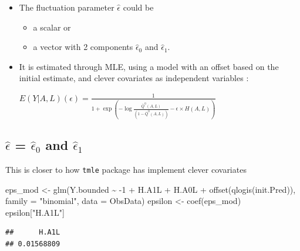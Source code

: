 \documentclass[
]{book}
\newenvironment{Shaded}{\begin{snugshade}}{\end{snugshade}}
\newcommand{\AttributeTok}[1]{\textcolor[rgb]{0.77,0.63,0.00}{#1}}
\newcommand{\DecValTok}[1]{\textcolor[rgb]{0.00,0.00,0.81}{#1}}
\newcommand{\FunctionTok}[1]{\textcolor[rgb]{0.00,0.00,0.00}{#1}}
\newcommand{\NormalTok}[1]{#1}
\newcommand{\OtherTok}[1]{\textcolor[rgb]{0.56,0.35,0.01}{#1}}
\newcommand{\SpecialCharTok}[1]{\textcolor[rgb]{0.00,0.00,0.00}{#1}}
\newcommand{\StringTok}[1]{\textcolor[rgb]{0.31,0.60,0.02}{#1}}
\providecommand{\tightlist}{%
  \setlength{\itemsep}{0pt}\setlength{\parskip}{0pt}}
\begin{document}
\begin{itemize}
\item
  The fluctuation parameter \(\hat\epsilon\) could be

  \begin{itemize}
  \tightlist
  \item
    a scalar or
  \item
    a vector with 2 components \(\hat\epsilon_0\) and \(\hat\epsilon_1\).
  \end{itemize}
\item
  It is estimated through MLE, using a model with an offset based on the initial estimate, and clever covariates as independent variables \citep{gruber2009targeted}:

  \(E(Y|A,L)(\epsilon) = \frac{1}{1+\exp(-\log\frac{\bar Q^0(A,L)}{(1-\bar Q^0(A,L))}-\epsilon \times H(A,L))}\)
\end{itemize}

\hypertarget{hatepsilon-hatepsilon_0-and-hatepsilon_1}{%
\subsection{\texorpdfstring{\(\hat\epsilon\) = \(\hat\epsilon_0\) and \(\hat\epsilon_1\)}{\textbackslash hat\textbackslash epsilon = \textbackslash hat\textbackslash epsilon\_0 and \textbackslash hat\textbackslash epsilon\_1}}\label{hatepsilon-hatepsilon_0-and-hatepsilon_1}}

This is closer to how \texttt{tmle} package has implement clever covariates

\begin{Shaded}
\begin{Highlighting}[]
\NormalTok{eps\_mod }\OtherTok{\textless{}{-}} \FunctionTok{glm}\NormalTok{(Y.bounded }\SpecialCharTok{\textasciitilde{}} \SpecialCharTok{{-}}\DecValTok{1} \SpecialCharTok{+}\NormalTok{ H.A1L }\SpecialCharTok{+}\NormalTok{ H.A0L }\SpecialCharTok{+}  
                 \FunctionTok{offset}\NormalTok{(}\FunctionTok{qlogis}\NormalTok{(init.Pred)), }
               \AttributeTok{family =} \StringTok{"binomial"}\NormalTok{,}
               \AttributeTok{data =}\NormalTok{ ObsData)}
\NormalTok{epsilon }\OtherTok{\textless{}{-}} \FunctionTok{coef}\NormalTok{(eps\_mod)  }
\NormalTok{epsilon[}\StringTok{"H.A1L"}\NormalTok{]}
\end{Highlighting}
\end{Shaded}

\begin{verbatim}
##      H.A1L 
## 0.01568809
\end{verbatim}
\end{document}
